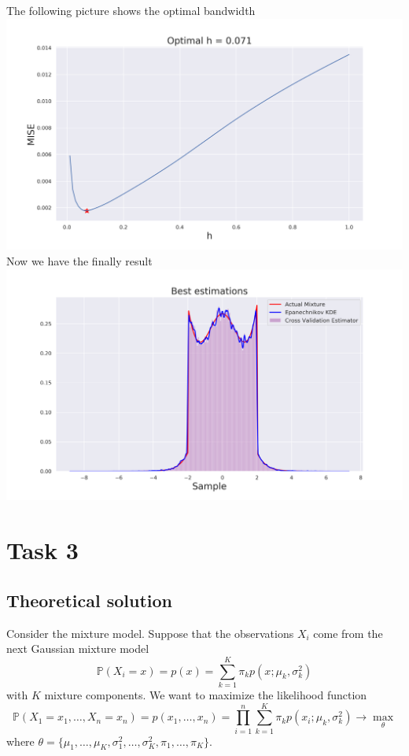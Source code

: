 \documentclass[a4paper, 12pt]{article}
\begin{document}
The following picture shows the optimal bandwidth \\
\includegraphics[width=\textwidth]{Images/Task2_3.png}
Now we have the finally result \\
\includegraphics[width=\textwidth]{Images/Task2_4.png}


\section{Task 3}
\subsection{Theoretical solution}
Consider the mixture model. Suppose that the observations $X_i$ come from the next Gaussian mixture model
$$
\mathbb{P}(X_i = x) = p(x) = \sum \limits_{k=1}^K \pi_k p(x; \mu_k, \sigma^2_k)
$$
with $K$ mixture components. 
We want to maximize the likelihood function
$$
\mathbb{P}(X_1 = x_1, \ldots, X_n = x_n) = p(x_1, \ldots, x_n) = \prod \limits_{i=1}^n \sum \limits_{k=1}^K \pi_k p(x_i; \mu_k, \sigma^2_k) \rightarrow \max \limits_{\theta}
$$
where $\theta = \{ \mu_1, \ldots, \mu_K, \sigma_1^2, \ldots, \sigma_K^2, \pi_1, \ldots, \pi_K \}.$
\end{document}
